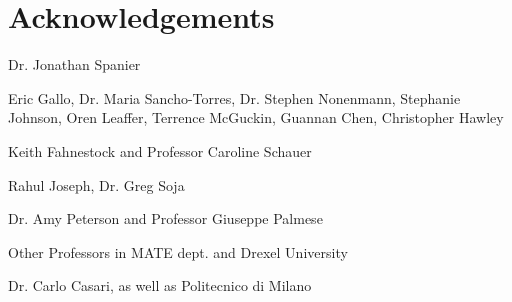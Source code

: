 \chapter*{Acknowledgements}


Dr. Jonathan Spanier

Eric Gallo, Dr. Maria Sancho-Torres, Dr. Stephen Nonenmann, Stephanie Johnson, Oren Leaffer, Terrence McGuckin, Guannan Chen, Christopher Hawley

Keith Fahnestock and Professor Caroline Schauer

Rahul Joseph, Dr. Greg Soja

Dr. Amy Peterson and Professor Giuseppe Palmese

Other Professors in MATE dept. and Drexel University

Dr. Carlo Casari, as well as Politecnico di Milano
